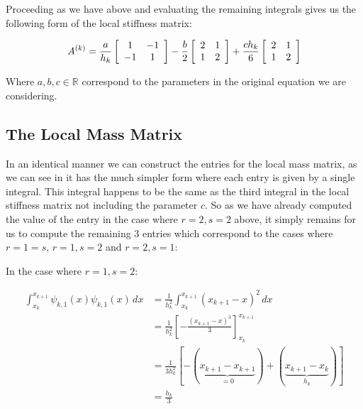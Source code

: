 Proceeding as we have above and evaluating the remaining integrals gives us the
following form of the local stiffness matrix:

\begin{equation}\label{eq:oned-determinisitic-local-stiffness}
    A^{(k)} = \frac{a}{h_k}\left[\begin{array}{c c}
                1 & -1 \\ -1 & 1
              \end{array}\right]
              -\frac{b}{2}\left[\begin{array}{c c}
                2 & 1\\ 1 & 2
              \end{array}\right]
              + \frac{ch_k}{6}\left[\begin{array}{c c}
                2 & 1 \\ 1 & 2
              \end{array}\right]
\end{equation}

Where $a,b,c \in \mathbb{R}$ correspond to the parameters in the original
equation  we are considering.

\subsection{The Local Mass Matrix}

In an identical manner we can construct the entries for the local mass matrix,
as we can see in  it has the much
simpler form where each entry is given by a single integral. This integral
happens to be the same as the third integral in the local stiffness matrix not
including the parameter $c$. So as we have already computed  the value of the
entry in the case where $r = 2, s = 2$ above, it simply remains for us to
compute the remaining 3 entries which correspond to the cases where $r = 1 =
s$, $r = 1, s = 2$ and $r = 2, s = 1$:

In the case where $r = 1, s = 2$:

\begin{align*}
    \int_{x_k}^{x_{k+1}}\psi_{k,1}(x)\psi_{k,1}(x)\, dx
        &= \frac{1}{h_k^2}\int_{x_k}^{x_{k+1}}(x_{k+1} - x)^2\, dx \\
        &= \frac{1}{h_k^2}\left[-\frac{(x_{k+1} - x)^3}{3}\right]_{x_k}^{x_{k+1}} \\
        &= \frac{1}{3h_k^2}\left[- (\underbrace{x_{k+1} - x_{k+1}}_{=0}) +
                                 (\underbrace{x_{k+1} - x_k}_{h_k})\right] \\
        &= \frac{h_k}{3}
\end{align*}

